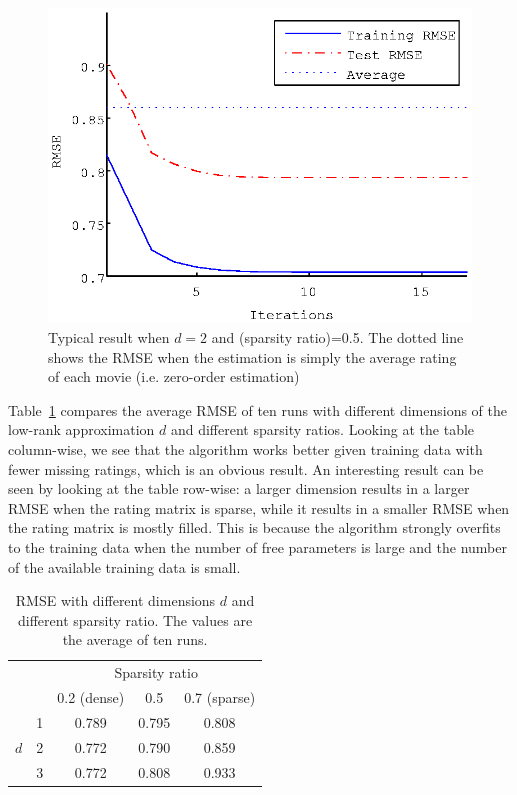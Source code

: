 \documentclass{article}
\begin{document}
\begin{figure}[ht]
  \begin{center}
    \includegraphics[scale=0.6]{figure/lrem_typical_plot}
  \end{center}
  \caption{Typical result when $d = 2$ and (sparsity ratio)=0.5. The dotted line shows the RMSE when the estimation is simply the average rating of each movie (i.e. zero-order estimation)}
  \label{fig:lrem_typical_plot}
\end{figure}

Table~\ref{table:lrem_result} compares the average RMSE of ten runs
with different dimensions of the low-rank approximation $d$ and
different sparsity ratios. Looking at the table column-wise, we see
that the algorithm works better given training data with fewer missing
ratings, which is an obvious result. An interesting result can be seen
by looking at the table row-wise: a larger dimension results in a
larger RMSE when the rating matrix is sparse, while it results in a
smaller RMSE when the rating matrix is mostly filled. This is because
the algorithm strongly overfits to the training data when the number
of free parameters is large and the number of the available training
data is small.

\begin{table}[ht]
 \caption{RMSE with different dimensions $d$ and different sparsity ratio. The values are the average of ten runs.}
 \label{table:lrem_result}
 \begin{center}
  \begin{tabular}{|c|c||c|c|c|}
    \hline
    \multicolumn{2}{|c|}{}  & \multicolumn{3}{|c|}{Sparsity ratio} \\
    \cline{3-5}
     \multicolumn{2}{|c|}{}    &  0.2 (dense)  &  0.5  & 0.7 (sparse)  \\
    \hline
    \hline
       & 1 &  0.789  &  0.795  &   0.808\\
    \cline{2-5}
     $d$ & 2 &  0.772  &  0.790  & 0.859\\
    \cline{2-5}
     & 3 &  0.772  &  0.808  &    0.933\\
    \hline
  \end{tabular}
 \end{center}
\end{table}
\end{document}

